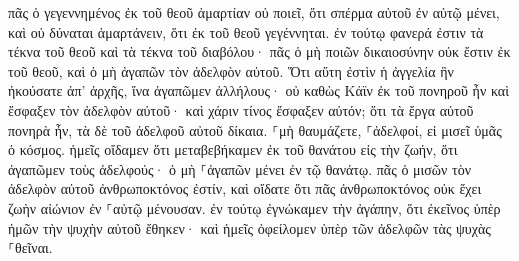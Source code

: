 \documentclass{openreader}
\begin{document}
πᾶς ὁ γεγεννημένος ἐκ τοῦ θεοῦ ἁμαρτίαν οὐ ποιεῖ, ὅτι σπέρμα αὐτοῦ ἐν αὐτῷ μένει, καὶ οὐ δύναται ἁμαρτάνειν, ὅτι ἐκ τοῦ θεοῦ γεγέννηται. 
ἐν τούτῳ φανερά ἐστιν τὰ τέκνα τοῦ θεοῦ καὶ τὰ τέκνα τοῦ διαβόλου· πᾶς ὁ μὴ ποιῶν δικαιοσύνην οὐκ ἔστιν ἐκ τοῦ θεοῦ, καὶ ὁ μὴ ἀγαπῶν τὸν ἀδελφὸν αὐτοῦ. 
Ὅτι αὕτη ἐστὶν ἡ ἀγγελία ἣν ἠκούσατε ἀπ’ ἀρχῆς, ἵνα ἀγαπῶμεν ἀλλήλους· 
οὐ καθὼς Κάϊν ἐκ τοῦ πονηροῦ ἦν καὶ ἔσφαξεν τὸν ἀδελφὸν αὐτοῦ· καὶ χάριν τίνος ἔσφαξεν αὐτόν; ὅτι τὰ ἔργα αὐτοῦ πονηρὰ ἦν, τὰ δὲ τοῦ ἀδελφοῦ αὐτοῦ δίκαια. 
⸀μὴ θαυμάζετε, ⸀ἀδελφοί, εἰ μισεῖ ὑμᾶς ὁ κόσμος. 
ἡμεῖς οἴδαμεν ὅτι μεταβεβήκαμεν ἐκ τοῦ θανάτου εἰς τὴν ζωήν, ὅτι ἀγαπῶμεν τοὺς ἀδελφούς· ὁ μὴ ⸀ἀγαπῶν μένει ἐν τῷ θανάτῳ. 
πᾶς ὁ μισῶν τὸν ἀδελφὸν αὐτοῦ ἀνθρωποκτόνος ἐστίν, καὶ οἴδατε ὅτι πᾶς ἀνθρωποκτόνος οὐκ ἔχει ζωὴν αἰώνιον ἐν ⸀αὐτῷ μένουσαν. 
ἐν τούτῳ ἐγνώκαμεν τὴν ἀγάπην, ὅτι ἐκεῖνος ὑπὲρ ἡμῶν τὴν ψυχὴν αὐτοῦ ἔθηκεν· καὶ ἡμεῖς ὀφείλομεν ὑπὲρ τῶν ἀδελφῶν τὰς ψυχὰς ⸀θεῖναι. 
\end{document}
